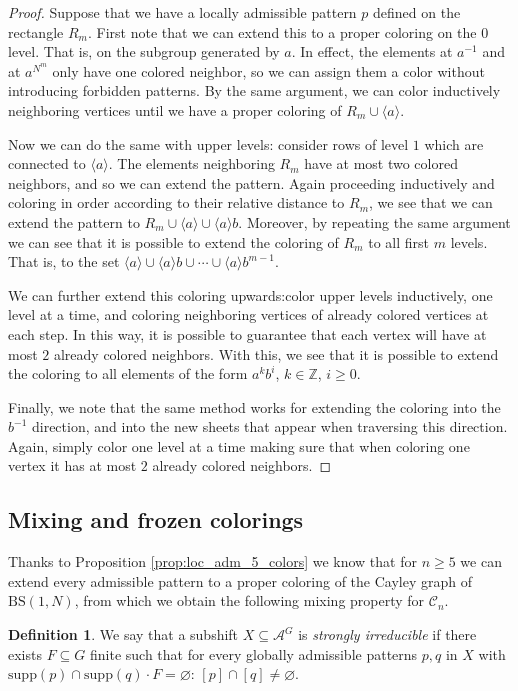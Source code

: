 \documentclass[letterpaper,11pt,reqno]{amsart}
\theoremstyle{plain}
\theoremstyle{definition}
\newtheorem{definition}{Definition}[section]
\newcommand{\BS}[1][N]{\mathrm{BS}(1,#1)}
\begin{document}
\begin{proof}
	Suppose that we have a locally admissible pattern $p$ defined on the rectangle $R_{m}$. First note that we can extend this to a proper coloring on the $0$ level. That is, on the subgroup generated by $a$. In effect, the elements at $a^{-1}$ and at $a^{N^m}$ only have one colored neighbor, so we can assign them a color without introducing forbidden patterns. By the same argument, we can color inductively neighboring vertices until we have a proper coloring of $R_m\cup \langle a \rangle$.
	
	Now we can do the same with upper levels: consider rows of level $1$ which are connected to $\langle a\rangle$. The elements neighboring $R_m$ have at most two colored neighbors, and so we can extend the pattern. Again proceeding inductively and coloring in order according to their relative distance to $R_m$, we see that we can extend the pattern to $R_m\cup \langle a\rangle \cup \langle a\rangle b$. Moreover, by repeating the same argument we can see that it is possible to extend the coloring of $R_m$ to all first $m$ levels. That is, to the set $\langle a\rangle \cup \langle a\rangle b \cup \cdots \cup \langle a\rangle b^{m-1} .$
	
	We can further extend this coloring upwards:color upper levels inductively, one level at a time, and coloring neighboring vertices of already colored vertices at each step. In this way, it is possible to guarantee that each vertex will have at most $2$ already colored neighbors. With this, we see that it is possible to extend the coloring to all elements of the form $a^kb^i$, $k\in \mathbb{Z}$, $i\ge 0$.
	
	Finally, we note that the same method works for extending the coloring into the $b^{-1}$ direction, and into the new sheets that appear when traversing this direction. Again, simply color one level at a time making sure that when coloring one vertex it has at most $2$ already colored neighbors.
\end{proof}


\subsection{Mixing and frozen colorings}\label{subsection:mixing_and frozen}
Thanks to Proposition \ref{prop:loc_adm_5_colors} we know that for $n\ge 5$ we can extend every admissible pattern to a proper coloring of the Cayley graph of $\BS$, from which we obtain the following mixing property for $\mathcal{C}_n$.
\begin{definition} We say that a subshift $X\subseteq \mathcal{A}^G$ is \textit{strongly irreducible} if there exists $F\subseteq G$ finite such that for every globally admissible patterns $p,q$ in $X$ with $\mathrm{supp}(p)\cap \mathrm{supp}(q)\cdot F=\varnothing$: $[p]\cap [q]\neq \varnothing$.
\end{definition}
\end{document}
